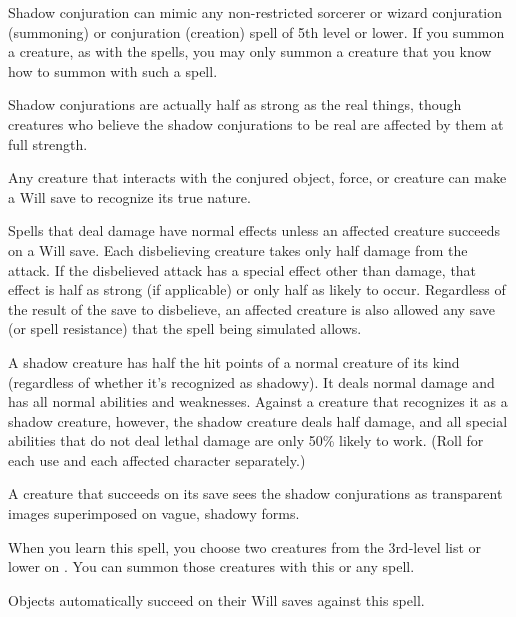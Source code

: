 \begin{spelleffect}
  Shadow conjuration can mimic any non-restricted sorcerer or wizard conjuration (summoning) or conjuration (creation) spell of 5th level or lower. If you summon a creature, as with the  spells, you may only summon a creature that you know how to summon with such a spell.
  \par Shadow conjurations are actually half as strong as the real things, though creatures who believe the shadow conjurations to be real are affected by them at full strength.
  \par Any creature that interacts with the conjured object, force, or creature can make a Will save to recognize its true nature.
  \par Spells that deal damage have normal effects unless an affected creature succeeds on a Will save. Each disbelieving creature takes only half damage from the attack. If the disbelieved attack has a special effect other than damage, that effect is half as strong (if applicable) or only half as likely to occur. Regardless of the result of the save to disbelieve, an affected creature is also allowed any save (or spell resistance) that the spell being simulated allows.
  \par A shadow creature has half the hit points of a normal creature of its kind (regardless of whether it's recognized as shadowy). It deals normal damage and has all normal abilities and weaknesses. Against a creature that recognizes it as a shadow creature, however, the shadow creature deals half damage, and all special abilities that do not deal lethal damage are only 50\% likely to work. (Roll for each use and each affected character separately.)
\end{spelleffect}
\begin{spellnotes}
  A creature that succeeds on its save sees the shadow conjurations as transparent images superimposed on vague, shadowy forms.
  \par When you learn this spell, you choose two creatures from the 3rd-level list or lower on . You can summon those creatures with this or any  spell.
  \par Objects automatically succeed on their Will saves against this spell.
\end{spellnotes}

